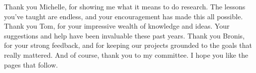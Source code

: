 Thank you Michelle, for showing me what it means to do research.
The lessons you've taught are endless, and your encouragement has made this all possible.
Thank you Tom, for your impressive wealth of knowledge and ideas. Your suggestions and help have been invaluable these past years.
Thank you Bronis, for your strong feedback, and for keeping our projects grounded to the goals that really mattered.
And of course, thank you to my committee.
I hope you like the pages that follow.



%


%
%


%
%
\tableofcontents %
%
\listoffigures %

\listoftables %




